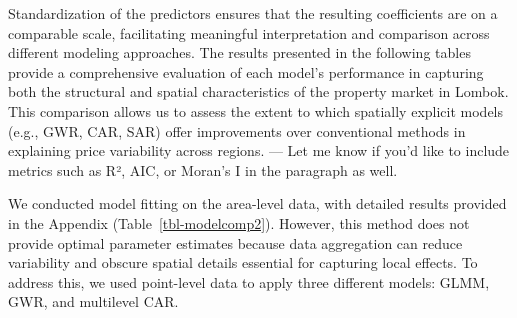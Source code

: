 \documentclass[
  default,
]{sn-jnl}
\begin{document}
Standardization of the predictors ensures that the resulting
coefficients are on a comparable scale, facilitating meaningful
interpretation and comparison across different modeling approaches. The
results presented in the following tables provide a comprehensive
evaluation of each model's performance in capturing both the structural
and spatial characteristics of the property market in Lombok. This
comparison allows us to assess the extent to which spatially explicit
models (e.g., GWR, CAR, SAR) offer improvements over conventional
methods in explaining price variability across regions. --- Let me know
if you'd like to include metrics such as R², AIC, or Moran's I in the
paragraph as well.

We conducted model fitting on the area-level data, with detailed results
provided in the Appendix (Table~\ref{tbl-modelcomp2}). However, this
method does not provide optimal parameter estimates because data
aggregation can reduce variability and obscure spatial details essential
for capturing local effects. To address this, we used point-level data
to apply three different models: GLMM, GWR, and multilevel CAR.
\end{document}
